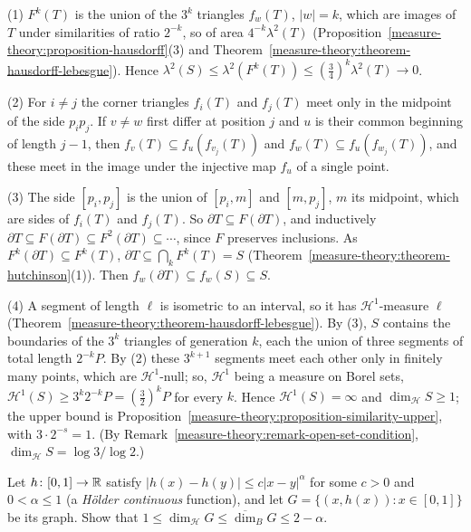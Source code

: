 \begin{solution}
(1) $F^k(T)$ is the union of the $3^k$ triangles $f_w(T)$, $|w| = k$, which are images of $T$ under similarities of ratio $2^{-k}$, so of area $4^{-k}\lambda^2(T)$ (Proposition~\ref{measure-theory:proposition-hausdorff}(3)
and Theorem~\ref{measure-theory:theorem-hausdorff-lebesgue}). Hence $\lambda^2(S) \leq \lambda^2(F^k(T)) \leq (\frac34)^k\lambda^2(T) \to 0$.

(2) For $i \neq j$ the corner triangles $f_i(T)$ and $f_j(T)$ meet only in the midpoint of the side $p_ip_j$. If $v \neq w$ first differ at position $j$ and $u$ is their common beginning of length
$j - 1$, then $f_v(T) \subseteq f_u(f_{v_j}(T))$ and $f_w(T) \subseteq f_u(f_{w_j}(T))$, and these meet in the image under the injective map $f_u$ of a single point.

(3) The side $[p_i, p_j]$ is the union of $[p_i, m]$ and $[m, p_j]$, $m$ its midpoint, which are sides of $f_i(T)$ and $f_j(T)$. So $\partial T \subseteq F(\partial T)$, and inductively
$\partial T \subseteq F(\partial T) \subseteq F^2(\partial T) \subseteq \cdots$, since $F$ preserves inclusions. As $F^k(\partial T) \subseteq F^k(T)$, $\partial T \subseteq \bigcap_kF^k(T) = S$
(Theorem~\ref{measure-theory:theorem-hutchinson}(1)). Then $f_w(\partial T) \subseteq f_w(S) \subseteq S$.

(4) A segment of length $\ell$ is isometric to an interval, so it has $\mathcal{H}^1$-measure $\ell$ (Theorem~\ref{measure-theory:theorem-hausdorff-lebesgue}). By (3), $S$ contains the boundaries of the $3^k$
triangles of generation $k$, each the union of three segments of total length $2^{-k}P$. By (2) these $3^{k+1}$ segments meet each other only in finitely many points, which are $\mathcal{H}^1$-null; so,
$\mathcal{H}^1$ being a measure on Borel sets, $\mathcal{H}^1(S) \geq 3^k2^{-k}P = (\frac32)^kP$ for every $k$. Hence $\mathcal{H}^1(S) = \infty$ and $\dim_{\mathcal{H}}S \geq 1$; the upper bound is
Proposition~\ref{measure-theory:proposition-similarity-upper}, with $3 \cdot 2^{-s} = 1$. (By Remark~\ref{measure-theory:remark-open-set-condition}, $\dim_{\mathcal{H}}S = \log 3/\log 2$.)
\end{solution}

\begin{exercise}\label{measure-theory:exercise-holder-graph}
Let $h \colon [0, 1] \to \mathbb{R}$ satisfy $|h(x) - h(y)| \leq c|x - y|^\alpha$ for some $c > 0$ and $0 < \alpha \leq 1$ (a \emph{H\"older continuous} function), and let
$G = \{(x, h(x)) : x \in [0, 1]\}$ be its graph. Show that $1 \leq \dim_{\mathcal{H}}G \leq \overline{\dim}_BG \leq 2 - \alpha$.
\end{exercise}

